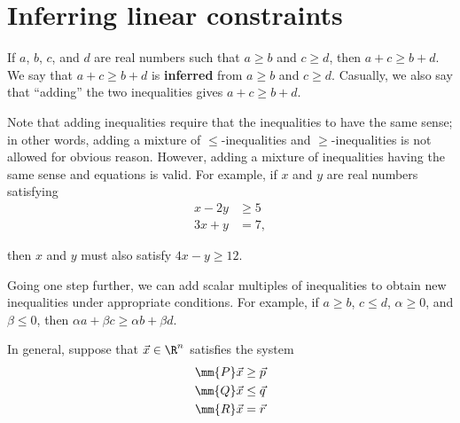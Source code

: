 %


\chapter{Inferring linear
constraints}\label{inferring-linear-constraints}

If \(a\), \(b\), \(c\), and \(d\) are real numbers such that
\(a \geq b\) and \(c \geq d\), then \(a + c \geq b + d\). We say that
\(a + c \geq b + d\) is \textbf{inferred} from \(a \geq b\) and
\(c \geq d\). Casually, we also say that ``adding'' the two inequalities
gives \(a + c \geq b + d\).

Note that adding inequalities require that the inequalities to have the
same sense; in other words, adding a mixture of \(\leq\)-inequalities
and \(\geq\)-inequalities is not allowed for obvious reason. However,
adding a mixture of inequalities having the same sense and equations is
valid. For example, if \(x\) and \(y\) are real numbers satisfying
\begin{align*}
x - 2y & \geq 5 \\
3x + y & = 7,
\end{align*}

then \(x\) and \(y\) must also satisfy \(4x - y \geq 12\).

Going one step further, we can add scalar multiples of inequalities to
obtain new inequalities under appropriate conditions. For example, if
\(a\geq b\), \(c \leq d\), \(\alpha \geq 0\), and \(\beta \leq 0\), then
\(\alpha a + \beta c \geq \alpha b + \beta d\).

In general, suppose that \(\vec{x} \in \R^n\) satisfies the system
\begin{align}
\begin{split}
\mm{P} \vec{x} & \geq \vec{p} \\
\mm{Q} \vec{x} & \leq \vec{q} \\
\mm{R} \vec{x} & = \vec{r} 
\end{split}
\label{eq:mixed-sys}
\end{align}

